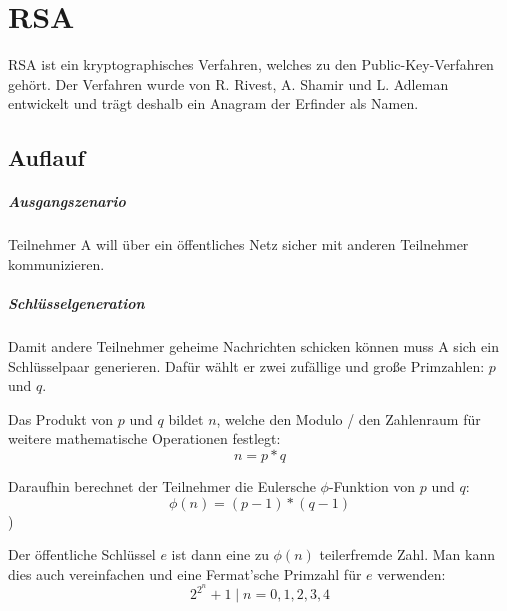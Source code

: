 \chapter{RSA}
\ac{RSA} ist ein kryptographisches Verfahren, welches zu den Public-Key-Verfahren gehört. Der Verfahren wurde von R. Rivest, A. Shamir und L. Adleman entwickelt und trägt deshalb ein Anagram der Erfinder als Namen.

\section{Auflauf}
    \paragraph{Ausgangszenario} Teilnehmer A will über ein öffentliches Netz sicher mit anderen Teilnehmer kommunizieren. 

    \paragraph{Schlüsselgeneration} Damit andere Teilnehmer geheime Nachrichten schicken können muss A sich ein Schlüsselpaar generieren. Dafür wählt er zwei zufällige und große Primzahlen: $p$ und $q$. 

    Das Produkt von $p$ und $q$ bildet $n$, welche den Modulo / den Zahlenraum für weitere mathematische Operationen festlegt: 
        \begin{equation}
            n = p * q
        \end{equation}

    Daraufhin berechnet der Teilnehmer die Eulersche $\phi$-Funktion von $p$ und $q$:
        \begin{equation}
            \phi(n) = (p-1) * (q-1)
        \end{equation})
    
    Der öffentliche Schlüssel $e$ ist dann eine zu $\phi(n)$ teilerfremde Zahl. Man kann dies auch vereinfachen und eine Fermat’sche Primzahl für $e$ verwenden:
        \begin{equation}
            2^{2^{n}}+1 \mid n=0,1,2,3,4
        \end{equation}

